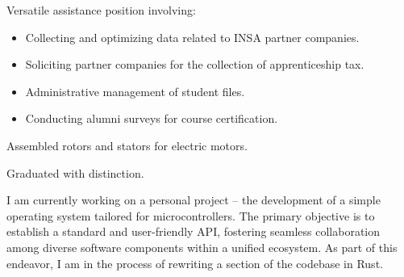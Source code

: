 \documentclass[10pt,a4paper,ragged2e,withhyper]{./AltaCV/altacv}
\begin{document}



\makecvheader



\begin{paracol}{2}


  Versatile assistance position involving:
  \begin{itemize}
  \item Collecting and optimizing data related to INSA partner companies.
  \item Soliciting partner companies for the collection of apprenticeship tax.
  \item Administrative management of student files.
  \item Conducting alumni surveys for course certification.
  \end{itemize}

  \divider


  Assembled rotors and stators for electric motors.

  \smallskip



  \divider

  Graduated with distinction.

  \divider


  \smallskip


  I am currently working on a personal project – the development of a simple operating system tailored for microcontrollers.
  The primary objective is to establish a standard and user-friendly API, fostering seamless collaboration among diverse software components within a unified ecosystem.
  As part of this endeavor, I am in the process of rewriting a section of the codebase in Rust.


\end{paracol}
\end{document}
